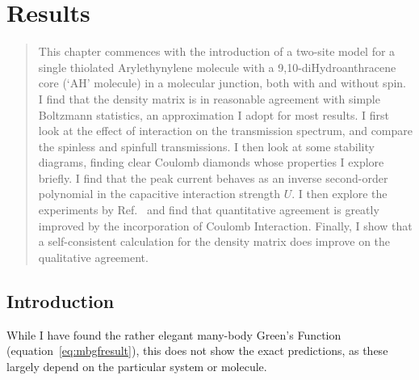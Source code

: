 \chapter{Results}
\label{ch:chapter_4}




\begin{abstract}
This chapter commences with the introduction of a two-site model for a single thiolated Arylethynylene molecule with a 9,10-diHydroanthracene
core (`AH' molecule) in a molecular junction, both with and without spin. I find that the density matrix is in reasonable agreement with simple Boltzmann statistics, an approximation I adopt for most results. I first look at the effect of interaction on the transmission spectrum, and compare the spinless and spinfull transmissions. I then look at some stability diagrams, finding clear Coulomb diamonds whose properties I explore briefly. I find that the peak current behaves as an inverse second-order polynomial in the capacitive interaction strength $U$. I then explore the experiments by Ref.~\cite{perrinnano} and find that quantitative agreement is greatly improved by the incorporation of Coulomb Interaction. Finally, I show that a self-consistent calculation for the density matrix does improve on the qualitative agreement.
\end{abstract}

\newpage
\section{Introduction}
While I have found the rather elegant many-body Green's Function (equation~\ref{eq:mbgfresult}), this does not show the exact predictions, as these largely depend on the particular system or molecule.

